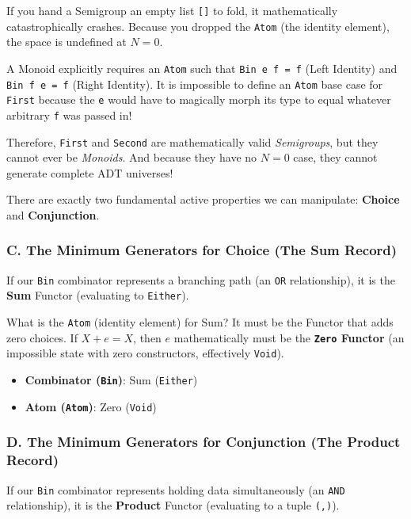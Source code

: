 \documentclass[
]{article}
\providecommand{\tightlist}{%
  \setlength{\itemsep}{0pt}\setlength{\parskip}{0pt}}
\begin{document}
If you hand a Semigroup an empty list \texttt{{[}{]}} to fold, it
mathematically catastrophically crashes. Because you dropped the
\texttt{Atom} (the identity element), the space is undefined at \(N=0\).

A Monoid explicitly requires an \texttt{Atom} such that
\texttt{Bin\ e\ f\ =\ f} (Left Identity) and \texttt{Bin\ f\ e\ =\ f}
(Right Identity). It is impossible to define an \texttt{Atom} base case
for \texttt{First} because the \texttt{e} would have to magically morph
its type to equal whatever arbitrary \texttt{f} was passed in!

Therefore, \texttt{First} and \texttt{Second} are mathematically valid
\emph{Semigroups}, but they cannot ever be \emph{Monoids}. And because
they have no \(N=0\) case, they cannot generate complete ADT universes!

There are exactly two fundamental active properties we can manipulate:
\textbf{Choice} and \textbf{Conjunction}.

\subsubsection{C. The Minimum Generators for Choice (The Sum
Record)}\label{c.-the-minimum-generators-for-choice-the-sum-record}

If our \texttt{Bin} combinator represents a branching path (an
\texttt{OR} relationship), it is the \textbf{Sum} Functor (evaluating to
\texttt{Either}).

What is the \texttt{Atom} (identity element) for Sum? It must be the
Functor that adds zero choices. If \(X + e = X\), then \(e\)
mathematically must be the \textbf{\texttt{Zero} Functor} (an impossible
state with zero constructors, effectively \texttt{Void}).

\begin{itemize}
\tightlist
\item
  \textbf{Combinator (\texttt{Bin})}: Sum (\texttt{Either})
\item
  \textbf{Atom (\texttt{Atom})}: Zero (\texttt{Void})
\end{itemize}

\subsubsection{D. The Minimum Generators for Conjunction (The Product
Record)}\label{d.-the-minimum-generators-for-conjunction-the-product-record}

If our \texttt{Bin} combinator represents holding data simultaneously
(an \texttt{AND} relationship), it is the \textbf{Product} Functor
(evaluating to a tuple \texttt{(,)}).
\end{document}
